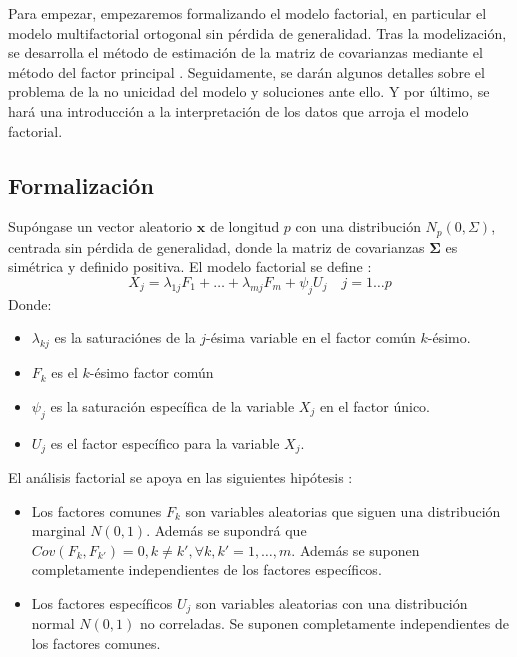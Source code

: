 \noindent Para empezar, empezaremos formalizando el modelo factorial, en particular el modelo multifactorial ortogonal \cite{Johnson 2007} sin pérdida de generalidad. Tras la modelización, se desarrolla el método de estimación de la matriz de covarianzas  mediante el método del factor principal \cite{Peña 2002}. Seguidamente, se darán algunos detalles sobre el problema de la no unicidad del modelo y soluciones ante ello. Y por último, se hará una introducción a la interpretación de los datos que arroja el modelo factorial. 

\newpage
\subsection{Formalización}
\noindent Supóngase un vector aleatorio $\mathbf{x}$ de longitud $p$ con una distribución $N_p(0,\Sigma)$, centrada sin pérdida de generalidad, donde la matriz de covarianzas $\mathbf{\Sigma}$ es simétrica y definido positiva. El modelo factorial se define \cite{Chatfield 1989}:  
\begin{equation}\label{eq Fact}
X_j= \lambda_{1j}F_1+\ldots+\lambda_{mj}F_m+\psi_j U_j\quad j=1\ldots p 
\end{equation}
\noindent Donde:
\begin{itemize}
\item $\lambda_{kj}$ es la saturaciónes   de la $j$-ésima variable en el factor común $k$-ésimo. 
\item $F_k$ es el $k$-ésimo factor común
\item $\psi_j$ es la saturación  específica de la variable $X_j$ en el factor único. 
\item $U_j$ es el factor específico para la variable $X_j$.
\end{itemize}

\noindent El análisis factorial se apoya en las siguientes hipótesis \cite{Cuadras 2014}:
\begin{itemize}
\item Los factores comunes $F_k$ son variables aleatorias que siguen una distribución marginal $N(0,1)$. Además se supondrá que $Cov(F_k,F_{k'})=0, k\neq k', \forall k,k'=1,\ldots, m$. Además se suponen completamente independientes de los factores específicos. 

\item Los factores específicos $U_j$ son variables aleatorias con una distribución normal $N(0,1)$ no correladas. Se suponen  completamente independientes de los factores comunes. 
\end{itemize}

